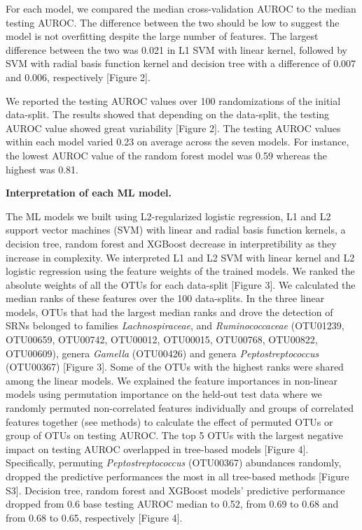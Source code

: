 \documentclass[11pt,]{article}
\begin{document}
For each model, we compared the median cross-validation AUROC to the
median testing AUROC. The difference between the two should be low to
suggest the model is not overfitting despite the large number of
features. The largest difference between the two was 0.021 in L1 SVM
with linear kernel, followed by SVM with radial basis function kernel
and decision tree with a difference of 0.007 and 0.006, respectively
{[}Figure 2{]}.

We reported the testing AUROC values over 100 randomizations of the
initial data-split. The results showed that depending on the data-split,
the testing AUROC value showed great variability {[}Figure 2{]}. The
testing AUROC values within each model varied 0.23 on average across the
seven models. For instance, the lowest AUROC value of the random forest
model was 0.59 whereas the highest was 0.81.

\textbf{Interpretation of each ML model.}

The ML models we built using L2-regularized logistic regression, L1 and
L2 support vector machines (SVM) with linear and radial basis function
kernels, a decision tree, random forest and XGBoost decrease in
interpretibility as they increase in complexity. We interpreted L1 and
L2 SVM with linear kernel and L2 logistic regression using the feature
weights of the trained models. We ranked the absolute weights of all the
OTUs for each data-split {[}Figure 3{]}. We calculated the median ranks
of these features over the 100 data-splits. In the three linear models,
OTUs that had the largest median ranks and drove the detection of SRNs
belonged to families \emph{Lachnospiraceae}, and \emph{Ruminococcaceae}
(OTU01239, OTU00659, OTU00742, OTU00012, OTU00015, OTU00768, OTU00822,
OTU00609), genera \emph{Gamella} (OTU00426) and genera
\emph{Peptostreptococcus} (OTU00367) {[}Figure 3{]}. Some of the OTUs
with the highest ranks were shared among the linear models. We explained
the feature importances in non-linear models using permutation
importance on the held-out test data where we randomly permuted
non-correlated features individually and groups of correlated features
together (see methods) to calculate the effect of permuted OTUs or group
of OTUs on testing AUROC. The top 5 OTUs with the largest negative
impact on testing AUROC overlapped in tree-based models {[}Figure 4{]}.
Specifically, permuting \emph{Peptostreptococcus} (OTU00367) abundances
randomly, dropped the predictive performances the most in all tree-based
methods {[}Figure S3{]}. Decision tree, random forest and XGBoost
models' predictive performance dropped from 0.6 base testing AUROC
median to 0.52, from 0.69 to 0.68 and from 0.68 to 0.65, respectively
{[}Figure 4{]}.
\end{document}
